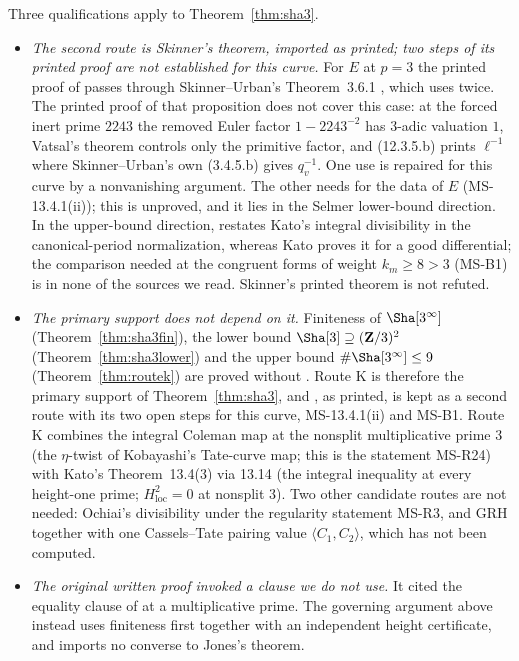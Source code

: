 \begin{remark}[Provenance at $3$]\label{rem:su}
Three qualifications apply to Theorem~\ref{thm:sha3}.
\begin{itemize}[leftmargin=*]
\item \emph{The second route is Skinner's theorem, imported as printed; two steps of its printed proof are not established for this curve.} For $E$ at $p=3$ the printed proof of \cite[Thm.~A]{skinner} passes through Skinner--Urban's Theorem~3.6.1 \cite{su}, which uses \cite[Prop.~12.3.6]{su} twice. The printed proof of that proposition does not cover this case: at the forced inert prime $2243$ the removed Euler factor $1-2243^{-2}$ has $3$-adic valuation $1$, Vatsal's theorem controls only the primitive factor, and (12.3.5.b) prints $\ell^{-1}$ where Skinner--Urban's own (3.4.5.b) gives $q_v^{-1}$. One use is repaired for this curve by a nonvanishing argument. The other needs \cite[Prop.~13.4.1(ii)]{su} for the data of $E$ (MS-13.4.1(ii)); this is unproved, and it lies in the Selmer lower-bound direction. In the upper-bound direction, \cite[Thm.~3.5.6]{su} restates Kato's integral divisibility in the canonical-period normalization, whereas Kato proves it for a good differential; the comparison needed at the congruent forms of weight $k_m\ge8>3$ (MS-B1) is in none of the sources we read. Skinner's printed theorem is not refuted.
\item \emph{The primary support does not depend on it.} Finiteness of $\Sha[3^\infty]$ (Theorem~\ref{thm:sha3fin}), the lower bound $\Sha[3]\supseteq(\Z/3)^2$ (Theorem~\ref{thm:sha3lower}) and the upper bound $\#\Sha[3^\infty]\le9$ (Theorem~\ref{thm:routek}) are proved without \cite{skinner}. Route K is therefore the primary support of Theorem~\ref{thm:sha3}, and \cite[Thm.~A]{skinner}, as printed, is kept as a second route with its two open steps for this curve, MS-13.4.1(ii) and MS-B1. Route K combines the integral Coleman map at the nonsplit multiplicative prime $3$ (the $\eta$-twist of Kobayashi's Tate-curve map; this is the statement MS-R24) with Kato's Theorem~13.4(3) via 13.14 (the integral inequality at every height-one prime; $H^2_{\mathrm{loc}}=0$ at nonsplit $3$). Two other candidate routes are not needed: Ochiai's divisibility \cite[Thm.~3 and Cor.~7.5]{ochiai} under the regularity statement MS-R3, and GRH together with one Cassels--Tate pairing value $\langle C_1,C_2\rangle$, which has not been computed.
\item \emph{The original written proof invoked a clause we do not use.} It cited the equality clause of \cite[Thm.~6.1]{sw} at a multiplicative prime. The governing argument above instead uses finiteness first together with an independent height certificate, and imports no converse to Jones's theorem.
\end{itemize}
\end{remark}

